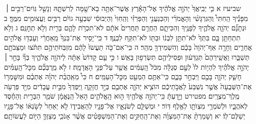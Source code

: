 \documentclass[twoside, openany, parskip=half, 11pt]{book}
\begin{document}
שביעיז א כִּ֤י יְבִֽיאֲךָ֙ יְהֹוָ֣ה אֱלֹהֶ֔יךָ אֶל־הָאָ֕רֶץ אֲשֶׁר־אַתָּ֥ה בָא־שָׁ֖מָּה לְרִשְׁתָּ֑הּ וְנָשַׁ֣ל גּֽוֹיִם־רַבִּ֣ים ׀ מִפָּנֶ֡יךָ הַֽחִתִּי֩ וְהַגִּרְגָּשִׁ֨י וְהָאֱמֹרִ֜י וְהַכְּנַעֲנִ֣י וְהַפְּרִזִּ֗י וְהַֽחִוִּי֙ וְהַיְבוּסִ֔י שִׁבְעָ֣ה גוֹיִ֔ם רַבִּ֥ים וַעֲצוּמִ֖ים מִמֶּֽךָּ׃ ב וּנְתָנָ֞ם יְהֹוָ֧ה אֱלֹהֶ֛יךָ לְפָנֶ֖יךָ וְהִכִּיתָ֑ם הַחֲרֵ֤ם תַּחֲרִים֙ אֹתָ֔ם לֹא־תִכְרֹ֥ת לָהֶ֛ם בְּרִ֖ית וְלֹ֥א תְחׇנֵּֽם׃ ג וְלֹ֥א תִתְחַתֵּ֖ן בָּ֑ם בִּתְּךָ֙ לֹא־תִתֵּ֣ן לִבְנ֔וֹ וּבִתּ֖וֹ לֹא־תִקַּ֥ח לִבְנֶֽךָ׃ ד כִּֽי־יָסִ֤יר אֶת־בִּנְךָ֙ מֵֽאַחֲרַ֔י וְעָבְד֖וּ אֱלֹהִ֣ים אֲחֵרִ֑ים וְחָרָ֤ה אַף־יְהֹוָה֙ בָּכֶ֔ם וְהִשְׁמִידְךָ֖ מַהֵֽר׃ ה כִּֽי־אִם־כֹּ֤ה תַעֲשׂוּ֙ לָהֶ֔ם מִזְבְּחֹתֵיהֶ֣ם תִּתֹּ֔צוּ וּמַצֵּבֹתָ֖ם תְּשַׁבֵּ֑רוּ וַאֲשֵֽׁירֵהֶם֙ תְּגַדֵּע֔וּן וּפְסִילֵיהֶ֖ם תִּשְׂרְפ֥וּן בָּאֵֽשׁ׃ ו כִּ֣י עַ֤ם קָדוֹשׁ֙ אַתָּ֔ה לַיהֹוָ֖ה אֱלֹהֶ֑יךָ בְּךָ֞ בָּחַ֣ר ׀ יְהֹוָ֣ה אֱלֹהֶ֗יךָ לִהְי֥וֹת לוֹ֙ לְעַ֣ם סְגֻלָּ֔ה מִכֹּל֙ הָֽעַמִּ֔ים אֲשֶׁ֖ר עַל־פְּנֵ֥י הָאֲדָמָֽה׃ ז לֹ֣א מֵֽרֻבְּכֶ֞ם מִכׇּל־הָֽעַמִּ֗ים חָשַׁ֧ק יְהֹוָ֛ה בָּכֶ֖ם וַיִּבְחַ֣ר בָּכֶ֑ם כִּֽי־אַתֶּ֥ם הַמְעַ֖ט מִכׇּל־הָעַמִּֽים׃ ח כִּי֩ מֵאַֽהֲבַ֨ת יְהֹוָ֜ה אֶתְכֶ֗ם וּמִשׇּׁמְר֤וֹ אֶת־הַשְּׁבֻעָה֙ אֲשֶׁ֤ר נִשְׁבַּע֙ לַאֲבֹ֣תֵיכֶ֔ם הוֹצִ֧יא יְהֹוָ֛ה אֶתְכֶ֖ם בְּיָ֣ד חֲזָקָ֑ה וַֽיִּפְדְּךָ֙ מִבֵּ֣ית עֲבָדִ֔ים מִיַּ֖ד פַּרְעֹ֥ה מֶֽלֶךְ־מִצְרָֽיִם׃ מפטירט וְיָ֣דַעְתָּ֔ כִּֽי־יְהֹוָ֥ה אֱלֹהֶ֖יךָ ה֣וּא הָֽאֱלֹהִ֑ים הָאֵל֙ הַֽנֶּאֱמָ֔ן שֹׁמֵ֧ר הַבְּרִ֣ית וְהַחֶ֗סֶד לְאֹהֲבָ֛יו וּלְשֹׁמְרֵ֥י מִצְוֺתָ֖ו לְאֶ֥לֶף דּֽוֹר׃ י וּמְשַׁלֵּ֧ם לְשֹׂנְאָ֛יו אֶל־פָּנָ֖יו לְהַאֲבִיד֑וֹ לֹ֤א יְאַחֵר֙ לְשֹׂ֣נְא֔וֹ אֶל־פָּנָ֖יו יְשַׁלֶּם־לֽוֹ׃ יא וְשָׁמַרְתָּ֨ אֶת־הַמִּצְוָ֜ה וְאֶת־הַֽחֻקִּ֣ים וְאֶת־הַמִּשְׁפָּטִ֗ים אֲשֶׁ֨ר אָנֹכִ֧י מְצַוְּךָ֛ הַיּ֖וֹם לַעֲשׂוֹתָֽם׃
\end{document}
